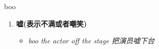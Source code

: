 
\begin{frame}
{\huge boo}
\begin{center}
\begin{enumerate}\Large
  \item \textbf{嘘(表示不满或者嘲笑)}
  \begin{itemize}
    \item \em{\Large{boo the actor off the stage 把演员嘘下台}}
  \end{itemize}
\end{enumerate}
\end{center}
\end{frame}
